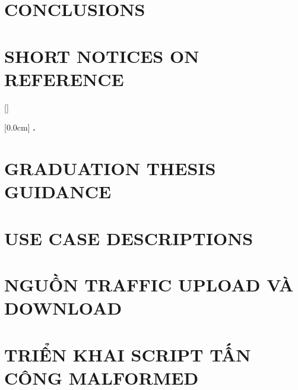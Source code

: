 \documentclass[a4paper,13pt,3p,twoside]{report}
\theoremstyle{definition}
\begin{document}
\newpage
\chapter{CONCLUSIONS}


\newpage
\chapter*{SHORT NOTICES ON REFERENCE} %
\label{chapter:reference}


\newpage
\renewcommand\bibname{REFERENCE}
\printbibliography
{}

\appendixpage
\appendix
\addappheadtotoc

[]
\titlespacing*{\chapter}{0pt}{-20pt}{20pt}

    [0.0cm]             %
    {\bfseries\vspace{0.3cm}}                  %
    {{\bfseries{\scshape} \thecontentslabel.\ }} %
    {}         %
    {\contentspage} 
    
\chapter{GRADUATION THESIS GUIDANCE}


\newpage
\chapter{USE CASE DESCRIPTIONS}


\newpage
\chapter{NGUỒN TRAFFIC UPLOAD VÀ DOWNLOAD}


\newpage
\chapter{TRIỂN KHAI SCRIPT TẤN CÔNG MALFORMED}

\end{document}
